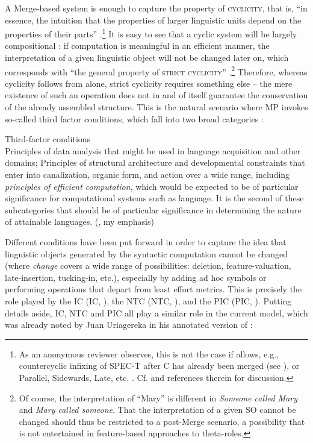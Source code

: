 \documentclass[output=paper]{langsci/langscibook}
\begin{document}
A Merge-based system is enough to capture the property of \textsc{cyclicity},
that is, “in essence, the intuition that the properties of larger linguistic
units depend on the properties of their parts”
\citep[1]{Chomsky2012}.\footnote{As an anonymous reviewer observes, this is not
the case if  allows, e.g., countercyclic infixing of SPEC-T after C has
already been merged (see \citealt{Chomsky2008}), or Parallel, Sidewards, Late,
etc. . Cf. \citet{ChoGalOtt2019} and references therein for discussion.}
It is easy to see that a cyclic system will be largely compositional
\parencites[5]{Chomsky2007}[2]{Chomsky2012}: if computation is meaningful in an
efficient manner, the interpretation of a given linguistic object will not be
changed later on, which corresponds with “the general property of
\textsc{strict cyclicity}” \citep[5]{Chomsky2007}.\footnote{Of course, the
    interpretation of “Mary” is different in \emph{Someone called Mary} and
    \emph{Mary called someone}. That the interpretation of a given
    \gls{SO} cannot
    be changed should thus be restricted to a post-Merge scenario, a
    possibility that is not entertained in feature-based approaches to
theta-roles.} Therefore, whereas cyclicity follows from  alone,
strict cyclicity requires something else -- the mere existence of such an
operation does not in and of itself guarantee the conservation of the already
assembled structure.  This is the natural scenario where \gls{MP} invokes
so-called third factor conditions, which fall into two broad categories
\citep{Chomsky2005}:

\ea%
    \label{ex:34.2}Third-factor conditions\\
    \ea Principles of data analysis that might be used in language acquisition
    and other domains;
    \ex Principles of structural architecture and developmental constraints
    that enter into canalization, organic form, and action over a wide range,
    including \emph{principles of efficient computation}, which would be
    expected to be of particular significance for computational systems such as
    language. It is the second of these subcategories that should be of
    particular significance in determining the nature of attainable languages.
    (\citealt[6]{Chomsky2005}, my emphasis)
    \z
\z

Different conditions have been put forward in order to capture the idea that
linguistic objects generated by the syntactic computation cannot be changed
(where \emph{change} covers a wide range of possibilities: deletion,
feature-valuation, late-insertion, tucking-in, etc.), especially by adding ad
hoc symbols or performing operations that depart from least effort metrics.
This is precisely the role played by the \textsc{\glsdesc{IC}}
(\gls{IC}, \citealt[228]{Chomsky1995}), the
\textsc{\glsdesc{NTC}} (\gls{NTC}, \citealt[138]{Chomsky2008}),
and the \textsc{\glsdesc{PIC}} (\gls{PIC},
\citealt{Chomsky2000}). Putting details aside, \gls{IC}, \gls{NTC} and \gls{PIC} all play a similar role in the current
model, which was already noted by Juan Uriagereka in his annotated version of
\citet{Chomsky2001}:
\end{document}
